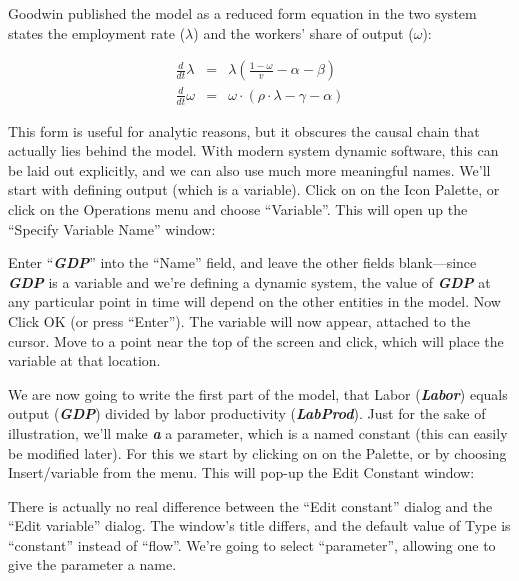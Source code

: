 \begin{itemize}
Goodwin published the model as a reduced form equation in the two
system states the employment rate ($\lambda$) and the workers' share
of output ($\omega$): 

\begin{eqnarray*}
\frac{d}{dt}\lambda&=&\lambda\left(\frac{1-\omega}{v}-\alpha-\beta\right)\\
\frac{d}{dt}\omega&=&\omega\cdot\left(\rho\cdot\lambda-\gamma-\alpha\right)
\end{eqnarray*}

\end{itemize}

This form is useful for analytic reasons, but it obscures the causal
chain that actually lies behind the model. With modern system dynamic
software, this can be laid out explicitly, and we can also use much
more meaningful names. We'll start with defining output (which is a
variable). Click on  on the Icon Palette, or
click on the Operations menu and choose ``Variable''. This will open
up the ``Specify Variable Name'' window:

\begin{center}
\end{center}

Enter ``{\em\bf GDP}'' into the ``Name'' field, and leave the other
fields blank---since {\em\bf GDP} is a variable and we're defining a
dynamic system, the value of {\em\bf GDP} at any particular point in
time will depend on the other entities in the model. Now Click OK (or
press ``Enter''). The variable will now appear, attached to the
cursor. Move to a point near the top of the screen and click, which
will place the variable at that location.

We are now going to write the first part of the model, that Labor
({\em\bf Labor}) equals output ({\em\bf GDP}) divided by labor
productivity ({\em\bf LabProd}). Just for the sake of illustration,
we'll make {\em\bf a} a parameter, which is a named constant (this can
easily be modified later). For this we start by clicking on
 on the Palette, or by choosing
Insert/variable from the menu. This will pop-up the Edit Constant
window:

\begin{center}
\end{center}

There is actually no real difference between the ``Edit constant''
dialog and the ``Edit variable'' dialog. The window's title differs,
and the default value of Type is ``constant'' instead of
``flow''. We're going to select ``parameter'', allowing one to give
the parameter a name.

